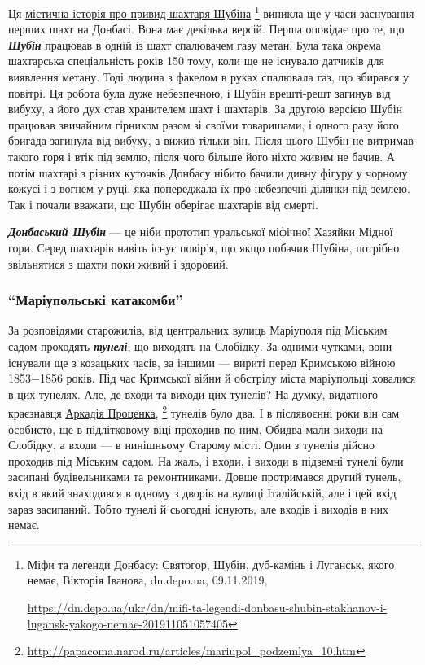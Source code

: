 Ця \href{https://dn.depo.ua/ukr/dn/mifi-ta-legendi-donbasu-shubin-stakhanov-i-lugansk-yakogo-nemae-201911051057405}{містична історія про привид шахтаря Шубіна}%
\footnote{Міфи та легенди Донбасу: Святогор, Шубін, дуб-камінь і Луганськ, якого немає, Вікторія Іванова, dn.depo.ua, 09.11.2019, \par%
\url{https://dn.depo.ua/ukr/dn/mifi-ta-legendi-donbasu-shubin-stakhanov-i-lugansk-yakogo-nemae-201911051057405}%
}
виникла ще у часи заснування перших шахт на Донбасі. Вона має декілька версій. Перша оповідає про те, що
\emph{\textbf{Шубін}} працював в одній із шахт спалювачем газу метан. Була така окрема
шахтарська спеціальність років 150 тому, коли ще не існувало датчиків для
виявлення метану. Тоді людина з факелом в руках спалювала газ, що збирався у
повітрі. Ця робота була дуже небезпечною, і Шубін врешті-решт загинув від
вибуху, а його дух став хранителем шахт і шахтарів. За другою версією Шубін
працював звичайним гірником разом зі своїми товаришами, і одного разу його
бригада загинула від вибуху, а вижив тільки він. Після цього Шубін не витримав
такого горя і втік під землю, після чого більше його ніхто живим не бачив. А
потім шахтарі з різних куточків Донбасу нібито бачили дивну фігуру у чорному
кожусі і з вогнем у руці, яка попереджала їх про небезпечні ділянки під землею.
Так і почали вважати, що Шубін оберігає шахтарів від смерті.

\emph{\textbf{Донбаський Шубін}} — це ніби прототип уральської міфічної Хазяйки Мідної гори.
Серед шахтарів навіть існує повір'я, що якщо побачив Шубіна, потрібно
звільнятися з шахти поки живий і здоровий.

\subsubsection{\enquote{Маріупольські катакомби}}


За розповідями старожилів, від центральних вулиць Маріуполя під Міським садом
проходять \emph{\textbf{тунелі}}, що виходять на Слобідку. За одними чутками, вони існували ще
з козацьких часів, за іншими — вириті перед Кримською війною 1853−1856 років.
Під час Кримської війни й обстрілу міста маріупольці ховалися в цих тунелях.
Але, де входи та виходи цих тунелів? На думку, видатного краєзнавця \href{http://papacoma.narod.ru/articles/mariupol_podzemlya_10.htm}{Аркадія Проценка},%
\footnote{\url{http://papacoma.narod.ru/articles/mariupol_podzemlya_10.htm}}
тунелів було два. І в післявоєнні роки він сам особисто, ще в
підлітковому віці проходив по ним. Обидва мали виходи на Слобідку, а входи — в
нинішньому Старому місті. Один з тунелів дійсно проходив під Міським садом. На
жаль, і входи, і виходи в підземні тунелі були засипані будівельниками та
ремонтниками. Довше протримався другий тунель, вхід в який знаходився в одному
з дворів на вулиці Італійській, але і цей вхід зараз засипаний. Тобто тунелі й
сьогодні існують, але входів і виходів в них немає.

